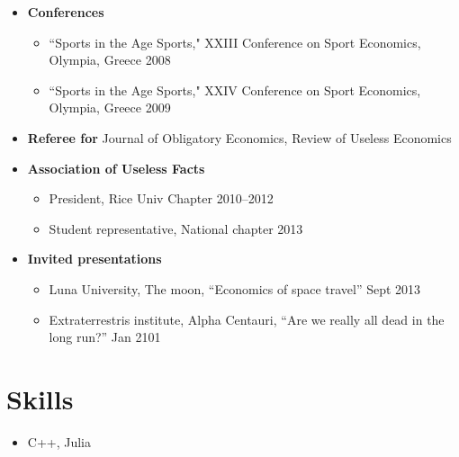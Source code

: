 \documentclass{article}[12]
\begin{document}
\begin{itemize}[itemsep=0.5em]

    \item \textbf{Conferences}
    \begin{itemize}
        \item ``Sports in the Age Sports," XXIII Conference on Sport Economics, Olympia, Greece \hfill 2008
        \item ``Sports in the Age Sports," XXIV Conference on Sport Economics, Olympia, Greece \hfill 2009
    \end{itemize}

    \item \textbf{Referee for} Journal of Obligatory Economics, Review of Useless Economics
    
    \item \textbf{Association of Useless Facts}
    \begin{itemize}
        \item President, Rice Univ Chapter \hfill 2010--2012
        \item Student representative, National chapter \hfill 2013
    \end{itemize}
    
    \item \textbf{Invited presentations}
    \begin{itemize}
        \item Luna University, The moon, ``Economics of space travel'' \hfill Sept 2013
        \item Extraterrestris institute, Alpha Centauri, ``Are we really all dead in the long run?'' \hfill Jan 2101
    \end{itemize}
    
\end{itemize}

\section{Skills}

\begin{itemize}
    \item C++, Julia
\end{itemize}
\end{document}
